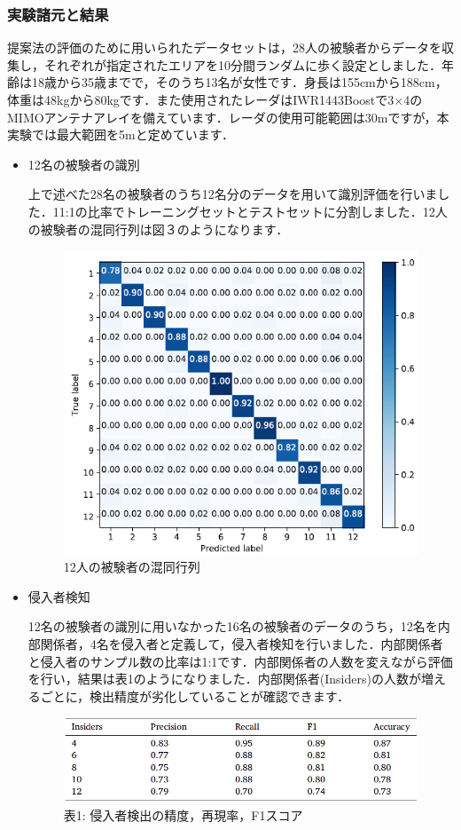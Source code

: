 \documentclass[dvipdfmx]{jsarticle}
\begin{document}
\subsubsection{実験諸元と結果}
提案法の評価のために用いられたデータセットは，28人の被験者からデータを収集し，それぞれが指定されたエリアを10分間ランダムに歩く設定としました．年齢は18歳から35歳までで，そのうち13名が女性です．身長は155cmから188cm，体重は48kgから80kgです．また使用されたレーダはIWR1443Boostで3×4のMIMOアンテナアレイを備えています．レーダの使用可能範囲は30mですが，本実験では最大範囲を5mと定めています．
\begin{itemize}
    \item 12名の被験者の識別
    
上で述べた28名の被験者のうち12名分のデータを用いて識別評価を行いました．11:1の比率でトレーニングセットとテストセットに分割しました．12人の被験者の混同行列は図３のようになります．
\begin{figure}[H]
\begin{center}
\includegraphics[width=0.6\linewidth]{./img/mID_conf.png}
\end{center}
\caption{12人の被験者の混同行列}
\end{figure}

    \item 侵入者検知

    12名の被験者の識別に用いなかった16名の被験者のデータのうち，12名を内部関係者，4名を侵入者と定義して，侵入者検知を行いました．内部関係者と侵入者のサンプル数の比率は1:1です．内部関係者の人数を変えながら評価を行い，結果は表1のようになりました．内部関係者(Insiders)の人数が増えるごとに，検出精度が劣化していることが確認できます．

\begin{figure}[H]
\caption*{表1: 侵入者検出の精度，再現率，F1スコア}
\begin{center}
\includegraphics[width=0.8\linewidth]{./img/mID_table.png}
\end{center}
\end{figure}
\end{itemize}
\end{document}

